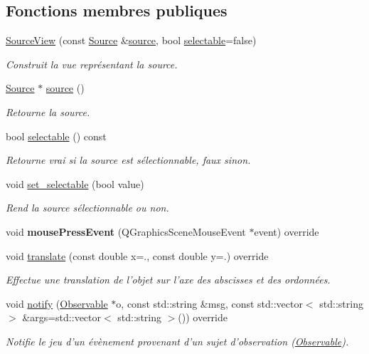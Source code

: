 \subsection*{Fonctions membres publiques}
\begin{DoxyCompactItemize}
\item 
\hyperlink{classSourceView_a978bb2492cf5379d407ee448f554dda6}{Source\+View} (const \hyperlink{classSource}{Source} \&\hyperlink{classSourceView_a39b5010fa2f3c764638d0c01eb97f616}{source}, bool \hyperlink{classSourceView_ab6c051d55846c3880a8f2672650327aa}{selectable}=false)
\begin{DoxyCompactList}\small\item\em Construit la vue représentant la source. \end{DoxyCompactList}\item 
\hyperlink{classSource}{Source} $\ast$ \hyperlink{classSourceView_a39b5010fa2f3c764638d0c01eb97f616}{source} ()
\begin{DoxyCompactList}\small\item\em Retourne la source. \end{DoxyCompactList}\item 
bool \hyperlink{classSourceView_ab6c051d55846c3880a8f2672650327aa}{selectable} () const 
\begin{DoxyCompactList}\small\item\em Retourne vrai si la source est sélectionnable, faux sinon. \end{DoxyCompactList}\item 
void \hyperlink{classSourceView_a64f81b9f42abf51e39b4b16fb8be3dff}{set\+\_\+selectable} (bool value)
\begin{DoxyCompactList}\small\item\em Rend la source sélectionnable ou non. \end{DoxyCompactList}\item 
\hypertarget{classSourceView_a04947a9f3d8c575b61c03d869be66408}{void {\bfseries mouse\+Press\+Event} (Q\+Graphics\+Scene\+Mouse\+Event $\ast$event) override}\label{classSourceView_a04947a9f3d8c575b61c03d869be66408}

\item 
void \hyperlink{classSourceView_a96144eb5f08c6dc6b378fa604bb626a2}{translate} (const double x=., const double y=.) override
\begin{DoxyCompactList}\small\item\em Effectue une translation de l’objet sur l’axe des abscisses et des ordonnées. \end{DoxyCompactList}\item 
void \hyperlink{classSourceView_a615ac7a3f10992488cccf60fd89044b0}{notify} (\hyperlink{classObservable}{Observable} $\ast$o, const std\+::string \&msg, const std\+::vector$<$ std\+::string $>$ \&args=std\+::vector$<$ std\+::string $>$()) override
\begin{DoxyCompactList}\small\item\em Notifie le jeu d'un évènement provenant d'un sujet d'observation (\hyperlink{classObservable}{Observable}). \end{DoxyCompactList}\end{DoxyCompactItemize}
